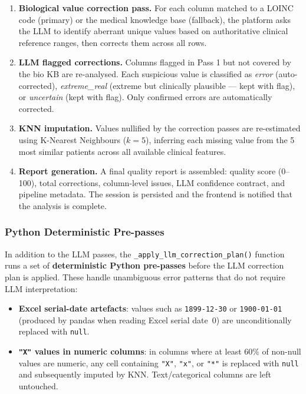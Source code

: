 \documentclass[12pt,a4paper,twoside]{report}
\begin{document}
\begin{description}
\begin{enumerate}
  \item \textbf{Biological value correction pass.} For each column matched to a LOINC code (primary) or the medical knowledge base (fallback), the platform asks the LLM to identify aberrant unique values based on authoritative clinical reference ranges, then corrects them across all rows.

  \item \textbf{LLM flagged corrections.} Columns flagged in Pass 1 but not covered by the bio KB are re-analysed. Each suspicious value is classified as \textit{error} (auto-corrected), \textit{extreme\_real} (extreme but clinically plausible --- kept with flag), or \textit{uncertain} (kept with flag). Only confirmed errors are automatically corrected.

  \item \textbf{KNN imputation.} Values nullified by the correction passes are re-estimated using K-Nearest Neighbours ($k=5$), inferring each missing value from the 5 most similar patients across all available clinical features.

  \item \textbf{Report generation.} A final quality report is assembled: quality score (0--100), total corrections, column-level issues, LLM confidence contract, and pipeline metadata. The session is persisted and the frontend is notified that the analysis is complete.

\end{enumerate}

\subsubsection*{Python Deterministic Pre-passes}

In addition to the LLM passes, the \texttt{\_apply\_llm\_correction\_plan()} function runs a set of \textbf{deterministic Python pre-passes} before the LLM correction plan is applied. These handle unambiguous error patterns that do not require LLM interpretation:

\begin{itemize}
  \item \textbf{Excel serial-date artefacts}: values such as \texttt{1899-12-30} or \texttt{1900-01-01} (produced by pandas when reading Excel serial date~0) are unconditionally replaced with \texttt{null}.

  \item \textbf{\texttt{"X"} values in numeric columns}: in columns where at least 60\% of non-null values are numeric, any cell containing \texttt{"X"}, \texttt{"x"}, or \texttt{"*"} is replaced with \texttt{null} and subsequently imputed by KNN. Text/categorical columns are left untouched.


\end{itemize}
\end{description}
\end{document}
